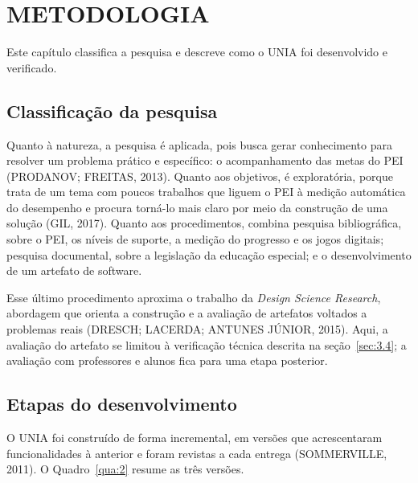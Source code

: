 
\chapter{METODOLOGIA}\label{cap:3}

Este capítulo classifica a pesquisa e descreve como o UNIA foi desenvolvido e verificado.

\section{Classificação da pesquisa}\label{sec:3.1}

Quanto à natureza, a pesquisa é aplicada, pois busca gerar conhecimento para resolver um problema prático e específico: o acompanhamento das metas do PEI (PRODANOV; FREITAS, 2013). Quanto aos objetivos, é exploratória, porque trata de um tema com poucos trabalhos que liguem o PEI à medição automática do desempenho e procura torná-lo mais claro por meio da construção de uma solução (GIL, 2017). Quanto aos procedimentos, combina pesquisa bibliográfica, sobre o PEI, os níveis de suporte, a medição do progresso e os jogos digitais; pesquisa documental, sobre a legislação da educação especial; e o desenvolvimento de um artefato de software.

Esse último procedimento aproxima o trabalho da \textit{Design Science Research}, abordagem que orienta a construção e a avaliação de artefatos voltados a problemas reais (DRESCH; LACERDA; ANTUNES JÚNIOR, 2015). Aqui, a avaliação do artefato se limitou à verificação técnica descrita na seção~\ref{sec:3.4}; a avaliação com professores e alunos fica para uma etapa posterior.

\section{Etapas do desenvolvimento}\label{sec:3.2}

O UNIA foi construído de forma incremental, em versões que acrescentaram funcionalidades à anterior e foram revistas a cada entrega (SOMMERVILLE, 2011). O Quadro~\ref{qua:2} resume as três versões.

